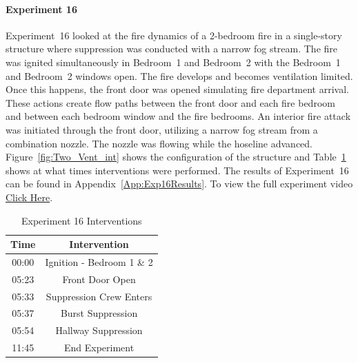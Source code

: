\documentclass[12pt,oneside]{book}
\begin{document}
\paragraph{Experiment 16}
Experiment~16 looked at the fire dynamics of a 2-bedroom fire in a single-story structure where suppression was conducted with a narrow fog stream. The fire was ignited simultaneously in Bedroom~1 and Bedroom~2 with the Bedroom~1 and Bedroom~2 windows open. The fire develops and becomes ventilation limited. Once this happens, the front door was opened simulating fire department arrival. These actions create flow paths between the front door and each fire bedroom and between each bedroom window and the fire bedrooms. An interior fire attack was initiated through the front door, utilizing a narrow fog stream from a combination nozzle. The nozzle was flowing while the hoseline advanced. Figure~\ref{fig:Two_Vent_int} shows the configuration of the structure and Table~\ref{Table:Exp16Interventions} shows at what times interventions were performed. The results of Experiment~16 can be found in Appendix~\ref{App:Exp16Results}. To view the full experiment video \href{https://player.vimeo.com/video/170510941?autoplay=1}{Click Here}.

\begin{table}[H]
	\centering
	\caption{Experiment 16 Interventions}
	\begin{tabular}{|c|c|} 
		\hline
		Time & Intervention \\ \hline \hline
		00:00 & Ignition - Bedroom 1 \& 2 \\ \hline
		05:23 & Front Door Open \\ \hline
		05:33 & Suppression Crew Enters\\ \hline
		05:37 & Burst Suppression \\ \hline 
		05:54 & Hallway Suppression \\ \hline
		11:45 & End Experiment\\ \hline
	\end{tabular}
	\label{Table:Exp16Interventions}
\end{table}

\FloatBarrier
\end{document}
